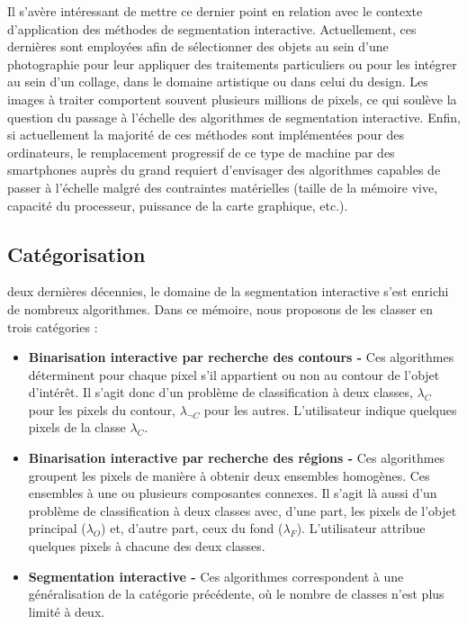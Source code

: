 Il s'avère intéressant de mettre ce dernier point en relation avec le contexte d'application des méthodes de segmentation interactive. Actuellement, ces dernières sont employées afin de sélectionner des objets au sein d'une photographie pour leur appliquer des traitements particuliers ou pour les intégrer au sein d'un collage, dans le domaine artistique ou dans celui du design. Les images à traiter comportent souvent plusieurs millions de pixels, ce qui soulève la question du passage à l'échelle des algorithmes de segmentation interactive. Enfin, si actuellement la majorité de ces méthodes sont implémentées pour des ordinateurs, le remplacement progressif de ce type de machine par des smartphones auprès du grand  requiert d'envisager des algorithmes capables de passer à l'échelle malgré des contraintes matérielles  (taille de la mémoire vive, capacité du processeur, puissance de la carte graphique, etc.).


\subsection{Catégorisation}

 deux dernières décennies, le domaine de la segmentation interactive s'est enrichi de nombreux algorithmes.  Dans ce mémoire, nous proposons de les classer en trois catégories :
\begin{itemize}
\item \textbf{Binarisation interactive par recherche des contours - } Ces algorithmes déterminent pour chaque pixel s'il appartient ou non au contour de l'objet d'intérêt. Il s'agit donc d'un problème de classification à deux classes,  $\lambda_{C}$ pour les pixels du contour, $\lambda_{\neg C}$ pour les autres.  L'utilisateur indique quelques pixels de la classe $\lambda_{C}$. 
\item \textbf{Binarisation interactive par recherche des régions - } Ces algorithmes groupent les pixels de manière à obtenir deux ensembles homogènes. Ces ensembles  à une ou plusieurs composantes connexes. Il s'agit là aussi d'un problème de classification à deux classes avec, d'une part, les pixels de l'objet principal ($\lambda_{O}$) et, d'autre part, ceux du fond  ($\lambda_{F}$). L'utilisateur attribue quelques pixels à chacune des deux classes. 
\item \textbf{Segmentation interactive  - } Ces algorithmes correspondent à une généralisation de la catégorie précédente, où le nombre de classes n'est plus limité à deux. 
\end{itemize}



